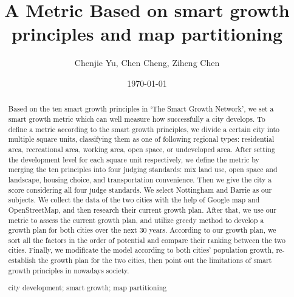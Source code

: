 \documentclass[a4paper,11pt]{article}
\title{A Metric Based on smart growth principles and map partitioning}
\author{\small Chenjie Yu, Chen Cheng, Ziheng Chen }
\date{\today}
\begin{document}
\begin{abstract}
Based on the ten smart growth principles in `The Smart Growth Network', we set a smart growth metric which can well measure how successfully a city develops.
To define a metric according to the smart growth principles, we divide a certain city into multiple square units, classifying them as one of following regional types: residential area, recreational area, working area, open space, or undeveloped area. After setting the development level for each square unit respectively, we define the metric by merging the ten principles into four judging standards: mix land use, open space and landscape, housing choice, and transportation convenience. Then we give the city a score considering all four judge standards.
We select Nottingham and Barrie as our subjects. We collect the data of the two cities with the help of Google map and OpenStreetMap, and then research their current growth plan. After that, we use our metric to assess the current growth plan, and utilize greedy method to develop a growth plan for both cities over the next 30 years. According to our growth plan, we sort all the factors in the order of potential and compare their ranking between the two cities.
Finally, we modificate the model according to both cities' population growth, re-establish the growth plan for the two cities, then point out the limitations of smart growth principles in nowadays society.
  \begin{keywords}
    city development; smart growth; map partitioning
  \end{keywords}
\end{abstract}

\maketitle
\thispagestyle{empty}
\pagestyle{empty}
\newpage

\tableofcontents
\newpage
\pagestyle{fancy}
\setcounter{page}{1}


\end{document}
